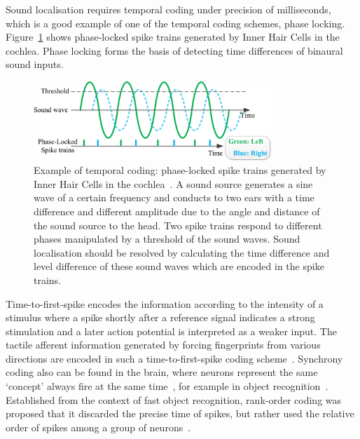 Sound localisation requires temporal coding under precision of milliseconds, which is a good example of one of the temporal coding schemes, phase locking.
Figure~\ref{Fig:audio_fibre} shows phase-locked spike trains generated by Inner Hair Cells in the cochlea.
Phase locking forms the basis
of detecting time differences of binaural sound inputs.
\begin{figure}[bt]
	\centering
	\includegraphics[width=0.8\textwidth]{pics_snn/phaselocking.png}
	\caption{Example of temporal coding: phase-locked spike trains generated by Inner Hair Cells in the cochlea~\cite{liu2013modeling}.
	A sound source generates a sine wave of a certain frequency and conducts to two ears with a time difference and different amplitude due to the angle and distance of the sound source to the head.
	Two spike trains respond to different phases manipulated by a threshold of the sound waves.
	Sound localisation should be resolved by calculating the time difference and level difference of these sound waves which are encoded in the spike trains.
    }
	\label{Fig:audio_fibre}
\end{figure}

Time-to-first-spike encodes the information according to the intensity of a stimulus where a spike shortly after a reference signal indicates a strong stimulation and a later action potential is interpreted as a weaker input.
The tactile afferent information generated by forcing fingerprints from various directions are encoded in such a time-to-first-spike coding scheme~\cite{johansson2004first}.
Synchrony coding also can be found in the brain, where neurons represent the same `concept' always fire at the same time~\cite{von1994correlation}, for example in object recognition~\cite{gray1989stimulus}.
Established from the context of fast object recognition, rank-order coding was proposed that it discarded the precise time of spikes, but rather used the relative order of spikes among a group of neurons~\cite{gautrais1998rate}.


